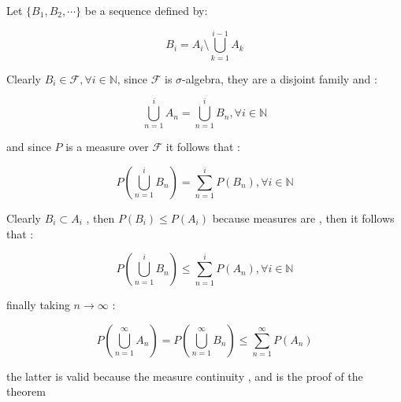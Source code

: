 \documentclass[12pt]{article}
\begin{document}
Let $\{B_1, B_2, \cdots \}$ be a sequence defined by:

$$ B_i = A_i \setminus \bigcup_{k=1}^{i-1} A_k$$

Clearly $B_i \in \mathcal{F}, \forall i \in \mathbb{N}$, since $\mathcal{F}$ is  $\sigma$-algebra, they are a disjoint family and :

$$ \bigcup_{n=1}^{i} A_n = \bigcup_{n=1}^{i} B_n ,  \forall i \in \mathbb{N}$$

and since $P$ is a measure over $\mathcal{F}$ it follows that :

$$ P(\bigcup_{n=1}^{i} B_n) = \sum_{n=1}^{i} P(B_n) ,  \forall i \in \mathbb{N}$$


Clearly $ B_i \subset A_i$ , then $P(B_i) \leq P(A_i)$ because measures are , then it follows that :

$$ P(\bigcup_{n=1}^{i} B_n) \leq \sum_{n=1}^{i} P(A_n),  \forall i \in \mathbb{N} $$

finally taking $n \to \infty$ :

$$ P(\bigcup_{n=1}^{\infty} A_n) = P(\bigcup_{n=1}^{\infty} B_n) \leq \sum_{n=1}^{\infty} P(A_n) $$

the latter is valid because the measure continuity , and is the proof of the theorem
\end{document}
